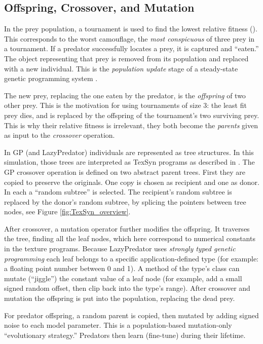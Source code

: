\documentclass[letterpaper]{article}
\newcommand{\jargon}[1]{\textit{#1}}
\newcommand{\texsyn}[0]{TexSyn}
\newcommand{\lazypredator}[0]{LazyPredator}
\begin{document}

\subsection{Offspring, Crossover, and Mutation}
In the prey population, a tournament is used to find the lowest relative fitness (). This corresponds to the worst camouflage, the \jargon{most conspicuous} of three prey in a tournament. If a predator successfully locates a prey, it is captured and “eaten.” The object representing that prey is removed from its population and replaced with a new individual. This is the \jargon{population update} stage of a steady-state genetic programming system \citep{syswerda_study_1991}.
\par
The new prey, replacing the one eaten by the predator, is the \jargon{offspring} of two other prey. This is the motivation for using tournaments of size 3: the least fit prey dies, and is replaced by the offspring of the tournament's two surviving prey. This is why their relative fitness is irrelevant, they both become the \jargon{parents} given as input to the \jargon{crossover} operation.
\par
In GP (and \lazypredator{}) individuals are represented as tree structures. In this simulation, those trees are interpreted as \texsyn{} programs as described in . The GP crossover operation is defined on two abstract parent trees. First they are copied to preserve the originals. One copy is chosen as recipient and one as donor. In each a “random subtree” is selected. The recipient's random subtree is replaced by the donor's random subtree, by splicing the pointers between tree nodes, see Figure \ref{fig:TexSyn_overview}.
\par
After crossover, a mutation operator further modifies the offspring. It traverses the tree, finding all the leaf nodes, which here correspond to numerical constants in the texture programs. Because \lazypredator{} uses \jargon{strongly typed genetic programming} \citep{montana_strongly_1995} each leaf belongs to a specific application-defined type (for example: a floating point number between 0 and 1). A method of the type's class can mutate (“jiggle”) the constant value of a leaf node (for example, add a small signed random offset, then clip back into the type's range). After crossover and mutation the offspring is put into the population, replacing the dead prey.
\par
For predator offspring, a random parent is copied, then mutated by adding signed noise to each model parameter. This is a population-based mutation-only “evolutionary strategy.” Predators then learn (fine-tune) during their lifetime.
\par
\end{document}
